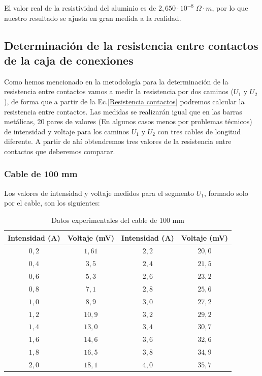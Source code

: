 \documentclass[a4paper,12pt,titlepage]{report}
\begin{document}
El valor real de la resistividad del aluminio es de $2,650 \cdot 10^{-8} \; \Omega \cdot m$, por lo que nuestro resultado se ajusta en gran medida a la realidad.

\newpage

\subsection{Determinación de la resistencia entre contactos de la caja de conexiones}

Como hemos mencionado en la metodología para la determinación de la resistencia entre contactos vamos a medir la resistencia por dos caminos ($U_{1}$ y $U_{2}$), de forma que a partir de la Ec.\ref{Resistencia contactos} podremos calcular la resistencia entre contactos. Las medidas se realizarán igual que en las barras metálicas, 20 pares de valores (En algunos casos menos por problemas técnicos) de intensidad y voltaje para los caminos $U_{1}$ y $U_{2}$ con tres cables de longitud diferente. A partir de ahí obtendremos tres valores de la resistencia entre contactos que deberemos comparar.

\subsubsection{Cable de 100 mm}

Los valores de intensidad y voltaje medidos para el segmento $U_{1}$, formado solo por el cable, son los siguientes:

\begin{table}[h!]
\centering
    \begin{tabular}{|c|c|c|c|}
        \hline
        Intensidad (A) & Voltaje (mV) & Intensidad (A) & Voltaje (mV) \\ \hline
        $0,2$ & $1,61$ & $2,2$ & $20,0$ \\ \hline
        $0,4$ & $3,5$ & $2,4$ & $21,5$ \\ \hline
        $0,6$ & $5,3$ & $2,6$ & $23,2$ \\ \hline
        $0,8$ & $7,1$ & $2,8$ & $25,6$ \\ \hline
        $1,0$ & $8,9$ & $3,0$ & $27,2$ \\ \hline
        $1,2$ & $10,9$ & $3,2$ & $29,2$ \\ \hline
        $1,4$ & $13,0$ & $3,4$ & $30,7$ \\ \hline
        $1,6$ & $14,6$ & $3,6$ & $32,6$ \\ \hline
        $1,8$ & $16,5$ & $3,8$ & $34,9$ \\ \hline
        $2,0$ & $18,1$ & $4,0$ & $35,7$ \\ \hline
    \end{tabular}
    \caption{Datos experimentales del cable de 100 mm}
\end{table}
\end{document}
